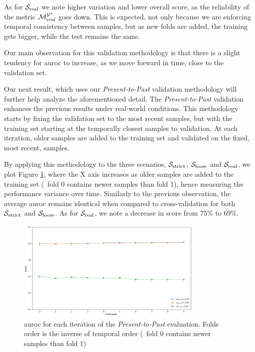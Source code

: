 As for $\mathcal{S}_{\mathrm{real}}$ we note higher variation and lower overall score, as the reliability of the metric $\mathcal{M}_{\mathrm{real}}^{\mathcal{V}^*}$ goes down.
This is expected, not only because we are enforcing temporal consistency between samples, but as new folds are added, the training gets bigger, while the test remains the same.

Our main observation for this validation methodology is that there is a slight tendency for \gls{auroc} to increase, as we move forward in time, close to the validation set.

\medskip

Our next result, which uses our \textit{Present-to-Past} validation methodology will further help analyze the aforementioned detail.
The \textit{Present-to-Past} validation enhances the previous results under real-world conditions.
This methodology starts by fixing the validation set to the most recent samples, but with the training set starting at the temporally closest samples to validation.
At each iteration, older samples are added to the training set and validated on the fixed, most recent, samples.

By applying this methodology to the three scenarios, $\mathcal{S}_{\mathrm{strict}}$, $\mathcal{S}_{\mathrm{loose}}$ and $\mathcal{S}_{\mathrm{real}}$, we plot Figure \ref{fig:presentpast}, where the X axis increases as older samples are added to the training set (\ie\ fold 0 contains newer samples than fold 1), hence measuring the performance variance over time.
Similarly to the previous observation, the average \gls{auroc} remains identical when compared to cross-validation for both $\mathcal{S}_{\mathrm{strict}}$ and $\mathcal{S}_{\mathrm{loose}}$.
As for $\mathcal{S}_{\mathrm{real}}$, we note a decrease in score from 75\% to 69\%.

\begin{figure}[!h]
	\centering
	\includegraphics[width=0.8\textwidth]{Figures/presentpast.png}
	\caption[Single layer results for static features in \textit{Present-to-Past}.]{\gls{auroc} for each iteration of the \textit{Present-to-Past} evaluation. Folds order is the inverse of temporal order (\ie\ fold 0 contains newer samples than fold 1)}
	\label{fig:presentpast}
\end{figure}

